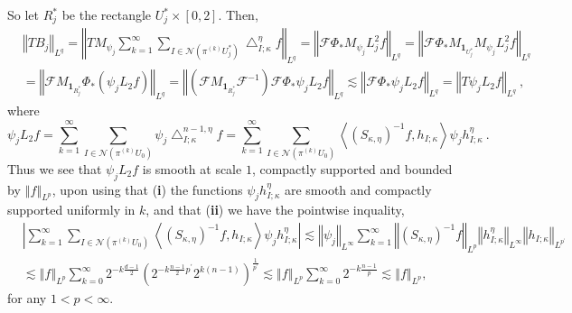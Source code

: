 \documentclass{amsart}%
\theoremstyle{plain}
\numberwithin{equation}{section}
\begin{document}
So let $R_{j}^{\ast}$ be the rectangle $U_{j}^{\ast}\times\left[  0,2\right]
$. Then,
\begin{align*}
& \left\Vert TB_{j}\right\Vert _{L^{q}}=\left\Vert TM_{\psi_{j}}\sum
_{k=1}^{\infty}\sum_{I\in\mathcal{N}\left(  \pi^{\left(  k\right)  }%
U_{j}^{\ast}\right)  }\bigtriangleup_{I;\kappa}^{\eta}f\right\Vert _{L^{q}%
}=\left\Vert \mathcal{F}\Phi_{\ast}M_{\psi_{j}}L_{j}^{2}f\right\Vert _{L^{q}%
}=\left\Vert \mathcal{F}\Phi_{\ast}M_{\mathbf{1}_{U_{j}^{\ast}}}M_{\psi_{j}%
}L_{j}^{2}f\right\Vert _{L^{q}}\\
& =\left\Vert \mathcal{F}M_{\mathbf{1}_{R_{j}^{\ast}}}\Phi_{\ast}\left(
\psi_{j}L_{2}f\right)  \right\Vert _{L^{q}}=\left\Vert \left(  \mathcal{F}%
M_{\mathbf{1}_{R_{j}^{\ast}}}\mathcal{F}^{-1}\right)  \mathcal{F}\Phi_{\ast
}\psi_{j}L_{2}f\right\Vert _{L^{q}}\lesssim\left\Vert \mathcal{F}\Phi_{\ast
}\psi_{j}L_{2}f\right\Vert _{L^{q}}=\left\Vert T\psi_{j}L_{2}f\right\Vert
_{L^{q}}\ ,
\end{align*}
where%
\[
\psi_{j}L_{2}f=\sum_{k=1}^{\infty}\sum_{I\in\mathcal{N}\left(  \pi^{\left(
k\right)  }U_{0}\right)  }\psi_{j}\bigtriangleup_{I;\kappa}^{n-1,\eta}%
f=\sum_{k=1}^{\infty}\sum_{I\in\mathcal{N}\left(  \pi^{\left(  k\right)
}U_{0}\right)  }\left\langle \left(  S_{\kappa,\eta}\right)  ^{-1}%
f,h_{I;\kappa}\right\rangle \psi_{j}h_{I;\kappa}^{\eta}\ .
\]
Thus we see that $\psi_{j}L_{2}f$ is smooth at scale $1$, compactly supported
and bounded by $\left\Vert f\right\Vert _{L^{p}}$, upon using that
(\textbf{i}) the functions $\psi_{j}h_{I;\kappa}^{\eta}$ are smooth and
compactly supported uniformly in $k$, and that (\textbf{ii}) we have the
pointwise inquality,
\begin{align*}
& \left\vert \sum_{k=1}^{\infty}\sum_{I\in\mathcal{N}\left(  \pi^{\left(
k\right)  }U_{0}\right)  }\left\langle \left(  S_{\kappa,\eta}\right)
^{-1}f,h_{I;\kappa}\right\rangle \psi_{j}h_{I;\kappa}^{\eta}\right\vert
\lesssim\left\Vert \psi_{j}\right\Vert _{L^{\infty}}\sum_{k=1}^{\infty
}\left\Vert \left(  S_{\kappa,\eta}\right)  ^{-1}f\right\Vert _{L^{p}%
}\left\Vert h_{I;\kappa}^{\eta}\right\Vert _{L^{\infty}}\left\Vert
h_{I;\kappa}\right\Vert _{L^{p^{\prime}}}\\
& \lesssim\left\Vert f\right\Vert _{L^{p}}\sum_{k=0}^{\infty}2^{-k\frac
{d-1}{2}}\left(  2^{-k\frac{n-1}{2}p^{\prime}}2^{k\left(  n-1\right)
}\right)  ^{\frac{1}{p^{\prime}}}\lesssim\left\Vert f\right\Vert _{L^{p}}%
\sum_{k=0}^{\infty}2^{-k\frac{n-1}{p}}\lesssim\left\Vert f\right\Vert _{L^{p}%
},
\end{align*}
for any $1<p<\infty$.
\end{document}
